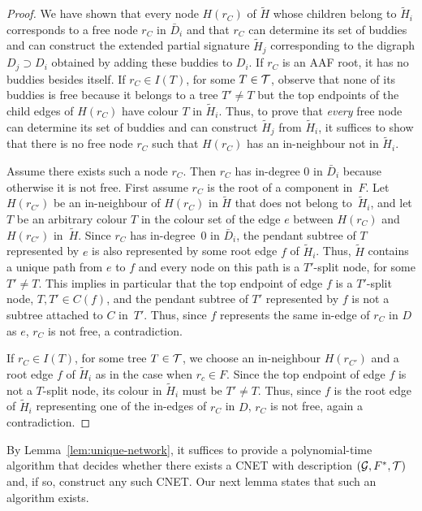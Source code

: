 \begin{proof}
  We have shown that every node $H(r_C)$ of $\tilde H$ whose children belong to
  $\tilde H_i$ corresponds to a free node $r_C$ in $\bar D_i$ and that $r_C$
  can determine its set of buddies and can construct the {extended partial signature} $\tilde H_j$
  corresponding to the {digraph} $D_j \supset D_i$ obtained by adding these buddies to $D_i$.
  If $r_C$ is an AAF root, it has no buddies besides itself.
  If $r_C \in I(T)$, for some $T \in \mathcal{T}$, observe that none of its buddies is
  free because it belongs to a tree $T' \ne T$ but the top endpoints of the
  child edges of $H(r_C)$ have colour $T$ in $\tilde H_i$.
  Thus, to prove that \emph{every} free node can determine its set of buddies
  and can construct $\tilde H_j$ from $\tilde H_i$, it suffices to show
  that there is no free node $r_C$ such that $H(r_C)$ has an in-neighbour not in
  $\tilde H_i$.

  Assume there exists such a node $r_C$.
  {Then} $r_C$ has in-degree $0$ in $\bar D_i$ because otherwise it
  is not free.
  First assume $r_C$ {is the root of a component} in~$F$.
  Let $H(r_{C'})$ be an in-neighbour of $H(r_C)$ in $\tilde H$ that does not
  belong to~$\tilde H_i$, and let $T$ be an arbitrary colour $T$ in the
  colour set of the edge $e$ between $H(r_C)$ and $H(r_{C'})$ in~$\tilde H$.
  Since $r_C$ has in-degree~$0$ {in $\bar D_i$}, the {pendant} subtree of $T$ represented by $e$ is also represented by some root edge $f$ of $\tilde H_i$.
  Thus, $\tilde H$ contains a unique path from $e$ to $f$ and every node on this
  path is a $T'$-split node, for some $T' \ne T$.
  This implies in particular that the top endpoint of edge $f$ is a $T'$-split
  node, {$T,T'\in C(f)$}, and the {pendant} subtree of $T'$ represented by $f$ is not a {subtree attached to $C$ in~$T'$}. Thus, since $f$ represents the same in-edge of $r_C$ in $D$ as $e$, $r_C$
  is not free, a contradiction.

  If $r_C \in I(T)$, for some tree $T \in \mathcal{T}$, we choose an in-neighbour
  $H(r_{C'})$ and a root edge $f$ of $\tilde H_i$ as in the case when
  $r_c \in F$.
  Since the top endpoint of edge $f$ is not a $T$-split node, its colour in
  $\tilde H_i$ must be $T' \ne T$.
  Thus, since $f$ is the root edge of $\tilde H_i$ representing one of the
  in-edges of $r_C$ in $D$, $r_C$ is not free, again a contradiction.
\end{proof}

By Lemma~\ref{lem:unique-network}, it suffices to provide a polynomial-time
algorithm that decides whether there exists a CNET
with description $(\mathcal{G}, F^*, \mathcal{T})$ and, if so, construct any such CNET.
Our next lemma states that such an algorithm exists.

